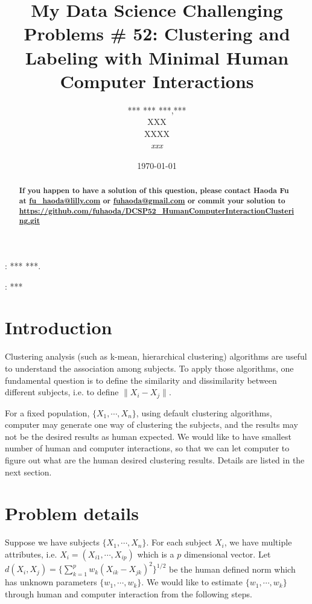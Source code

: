 \documentclass[12pt]{article}
\begin{document}
\title
{\bf My Data Science Challenging Problems \# 52: Clustering and Labeling with Minimal Human Computer Interactions}
\author
{
*** *** ***,***\\
XXX \\
XXXX \\
\textsl{xxx} }
\date{\today}

\maketitle
\begin{abstract}
\textbf{{\color[rgb]{1,0,0} If you happen to have a solution of this question, please contact Haoda Fu at \href{mailto:fu\_haoda@lilly.com }{fu\_haoda@lilly.com} or  \href{mailto:ffuhaoda@gmail.com}{fuhaoda@gmail.com}  or commit your solution to \url{https://github.com/fuhaoda/DCSP52_HumanComputerInteractionClustering.git} }
}

\end{abstract}

: *** ***.

: ***
\section{Introduction}
Clustering analysis (such as k-mean, hierarchical clustering) algorithms are useful to understand the association among subjects. To apply those algorithms, one fundamental question is to define the similarity and dissimilarity between different subjects, i.e. to define $\|X_i - X_j\|$.

For a fixed population, $\{X_1,\cdots, X_n\}$,  using default clustering algorithms, computer may generate one way of clustering the subjects, and the results may not be the desired results as human expected.  We would like to have smallest number of human and computer interactions, so that we can let computer to figure out what are the human desired clustering results.  Details are listed in the next section.

\section{Problem details}

Suppose we have subjects $\{X_1,\cdots, X_n\}$. For each subject $X_i$, we have multiple attributes, i.e. $X_i=(X_{i1},\cdots, X_{ip})$ which is a $p$ dimensional vector.  Let $d(X_i, X_j)=\{\sum_{k=1}^p w_k(X_{ik}-X_{jk})^2\}^{1/2}$ be the human defined norm which has unknown parameters $\{w_1, \cdots, w_k\}$. We would like to estimate $\{w_1, \cdots, w_k\}$ through human and computer interaction from the following steps.
\end{document}

